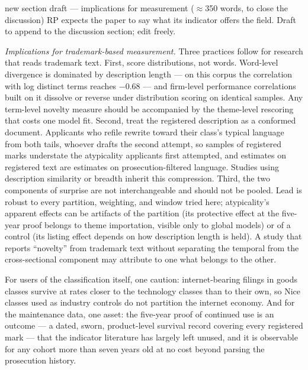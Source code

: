 \begin{ericbox}{new section draft --- implications for measurement ($\approx$350 words, to close the discussion)}
RP expects the paper to say what its indicator offers the field. Draft to
append to the discussion section; edit freely.

\medskip\noindent\emph{Implications for trademark-based measurement.}
Three practices follow for research that reads trademark text. First,
score distributions, not words. Word-level divergence is dominated by
description length --- on this corpus the correlation with log distinct
terms reaches $-0.68$ --- and firm-level performance correlations built
on it dissolve or reverse under distribution scoring on identical
samples. Any term-level novelty measure should be accompanied by the
theme-level rescoring that costs one model fit. Second, treat the
registered description as a conformed document. Applicants who refile
rewrite toward their class's typical language from both tails, whoever
drafts the second attempt, so samples of registered marks understate the
atypicality applicants first attempted, and estimates on registered text
are estimates on prosecution-filtered language. Studies using description
similarity or breadth inherit this compression. Third, the two components
of surprise are not interchangeable and should not be pooled. Lead is
robust to every partition, weighting, and window tried here; atypicality's
apparent effects can be artifacts of the partition (its protective effect
at the five-year proof belongs to theme importation, visible only to
global models) or of a control (its listing effect depends on how
description length is held). A study that reports ``novelty'' from
trademark text without separating the temporal from the cross-sectional
component may attribute to one what belongs to the other.

For users of the classification itself, one caution: internet-bearing
filings in goods classes survive at rates closer to the technology
classes than to their own, so Nice classes used as industry controls do
not partition the internet economy. And for the maintenance data, one
asset: the five-year proof of continued use is an outcome --- a dated,
sworn, product-level survival record covering every registered mark ---
that the indicator literature has largely left unused, and it is
observable for any cohort more than seven years old at no cost beyond
parsing the prosecution history.
\end{ericbox}
